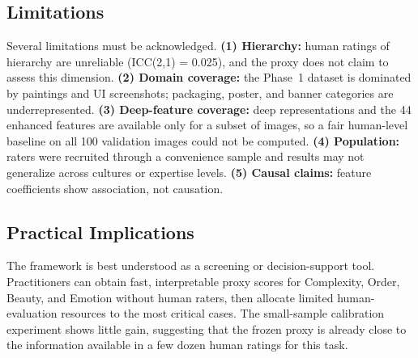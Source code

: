 \subsection{Limitations}

Several limitations must be acknowledged. \textbf{(1) Hierarchy:} human ratings of hierarchy are unreliable (ICC(2,1) = 0.025), and the proxy does not claim to assess this dimension. \textbf{(2) Domain coverage:} the Phase~1 dataset is dominated by paintings and UI screenshots; packaging, poster, and banner categories are underrepresented. \textbf{(3) Deep-feature coverage:} deep representations and the 44 enhanced features are available only for a subset of images, so a fair human-level baseline on all 100 validation images could not be computed. \textbf{(4) Population:} raters were recruited through a convenience sample and results may not generalize across cultures or expertise levels. \textbf{(5) Causal claims:} feature coefficients show association, not causation.

\subsection{Practical Implications}

The framework is best understood as a screening or decision-support tool. Practitioners can obtain fast, interpretable proxy scores for Complexity, Order, Beauty, and Emotion without human raters, then allocate limited human-evaluation resources to the most critical cases. The small-sample calibration experiment shows little gain, suggesting that the frozen proxy is already close to the information available in a few dozen human ratings for this task.
